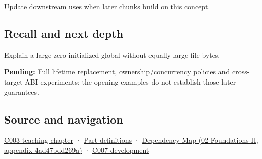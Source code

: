 Update downstream uses when later chunks build on this concept.

\subsection{Recall and next depth}\label{recall-and-next-depth}

Explain a large zero-initialized global without equally large file bytes.

\textbf{Pending:} Full lifetime replacement, ownership/concurrency policies and cross-target ABI experiments; the opening examples do not establish those later guarantees.

\subsection{Source and navigation}\label{source-and-navigation}

\href{Continuous\%20Notes/Computing\%20Foundations\%20-\%20From\%20Bits\%20to\%20C++\%20and\%20Systems\%20APIs\#Where\%20the\%20bytes\%20live}{C003 teaching chapter} · \hyperref[appendix-fd090d982a15]{Part definitions} · \href{}{Dependency Map (02-Foundations-II, appendix-4ad47bdd269a)} · \href{Continuous\%20Notes/Computing\%20Foundations\%20-\%20From\%20Bits\%20to\%20C++\%20and\%20Systems\%20APIs\#A\%20name\%20does\%20not\%20decide\%20how\%20long\%20storage\%20lasts}{C007 development}
